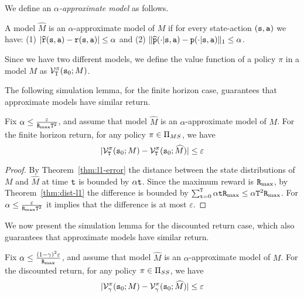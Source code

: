 We define an {\em $\alpha$-approximate model} as follows.
%
\begin{definition}
A model $\widehat{M}$ is an $\alpha$-approximate model of $M$
if for every state-action $({\tt s},{\tt a})$ we have: (1)
$|\widehat{{\tt r}}({\tt s},{\tt a})-{\tt r}({\tt s},{\tt a})|\leq
\alpha$ and (2)
$\|\widehat{{\tt p}}(\cdot|{\tt s},{\tt a})-{\tt p}(\cdot|{\tt s},{\tt a})\|_1\leq\alpha$.
\end{definition}

Since we have two different models, we define the value function of a policy $\pi$ in a model $M$ as $\mathcal{V}^\pi_{\tt T}({\tt s}_0;M)$.

The following simulation lemma, for the finite horizon case,
guarantees that approximate models have similar return.

\begin{lemma}
\label{lemma:approx-model-FH}
%
%
Fix $\alpha\leq \frac{\varepsilon}{{\tt R}_{\max } {\tt T}^2}$, and
assume that model $\widehat{M}$ is an $\alpha$-approximate model of
$M$. For the finite horizon return, for any policy $\pi \in
 {\Pi _{MS}}$, we have
\[
|\mathcal{V}^\pi_{\tt T}({\tt s}_0;M)-\mathcal{V}^\pi_{\tt T}({\tt s}_0;\widehat{M})|\leq
\varepsilon
\]
\end{lemma}

\begin{proof}
By Theorem~\ref{thm:l1-error} the distance between the state
distributions of $M$ and $\widehat{M}$ at time ${\tt t}$ is bounded
by $\alpha{\tt t}$. Since the maximum reward  is ${\tt R}_{\max }$, by
Theorem~\ref{thm:dist-l1} the difference is bounded by
$\sum_{{\tt t}=0}^{\tt T} \alpha{\tt t} {\tt R}_{\max }\leq \alpha{\tt T}^2
{\tt R}_{\max }$. For $\alpha\leq \frac{\varepsilon}{{\tt R}_{\max } {\tt T}^2}$ it
implies that the difference is at most $\varepsilon$.
\end{proof}


We now present the simulation lemma for the discounted return
case, which also guarantees that approximate models have similar
return.

\begin{lemma}
\label{lemma:approx-model-dic}
%
Fix $\alpha\leq \frac{(1-\gamma)^2\varepsilon}{{\tt R}_{\max }}$, and
assume that model $\widehat{M}$ is an $\alpha$-approximate model of $M$. For the discounted return, for any policy $\pi \in  {\Pi_{SS}}$, we have
\[
|\mathcal{V}^\pi_\gamma({\tt s}_0;M)-\mathcal{V}^\pi_\gamma({\tt s}_0;\widehat{M})|\leq
\varepsilon
\]
\end{lemma}

